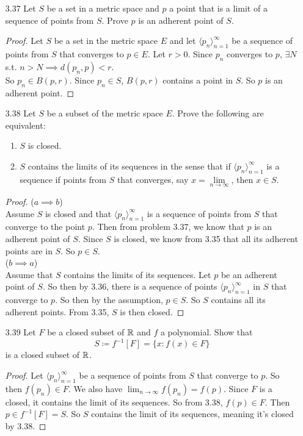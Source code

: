 \documentclass[14pt]{extarticle}
\begin{document}
\begin{enumerate}
		\item[3.37] Let $S$ be a set in a metric space and $p$ a point that is a limit of a sequence of points from $S$. Prove $p$ is an adherent point of $S$.
		\begin{proof}
			Let $S$ be a set in the metric space $E$ and let $\langle p_n \rangle^\infty_{n=1}$ be a sequence of points from $S$ that converges to $p \in E$. Let $r>0$. Since $p_n$ converges to $p$, $\exists N$ s.t. $n>N \implies d(p_n,p) < r$.\\
			So $p_n \in B(p,r)$. Since $p_n \in S$, $B(p,r)$ contains a point in $S$. So $p$ is an adherent point.
		\end{proof}
		
		\item[3.38] Let $S$ be a subset of the metric space $E$. Prove the following are equivalent:
		\begin{enumerate}
			\item $S$ is closed.
			\item $S$ contains the limits of its sequences in the sense that if $\langle p_n \rangle^\infty_{n=1}$ is a sequence if points from $S$ that converges, say $x = \lim\limits_{n\rightarrow\infty}$, then $x \in S$.
		\end{enumerate}
		\begin{proof}
			($a \implies b$)\\
			Assume $S$ is closed and that $\langle p_n \rangle^\infty_{n=1}$ is a sequence of points from $S$ that converge to the point $p$. Then from problem 3.37, we know that $p$ is an adherent point of $S$. Since $S$ is closed, we know from 3.35 that all its adherent points are in $S$. So $p \in S$.\\
			($b \implies a$)\\
			Assume that $S$ contains the limits of its sequences. Let $p$ be an adherent point of $S$. So then by 3.36, there is a sequence of points $\langle p_n \rangle^\infty_{n=1}$ in $S$ that converge to $p$. So then by the assumption, $p \in S$. So $S$ contains all its adherent points. From 3.35, $S$ is then closed. 
		\end{proof}
	
		\item[3.39] Let $F$ be a closed subset of $\mathbb{R}$ and $f$ a polynomial. Show that 
		\[S \coloneq f^{-1}[F] = \{x : f(x) \in F\}\]
		is a closed subset of $\mathbb{R}$.
		\begin{proof}
			Let $\langle p_n \rangle^\infty_{n=1}$ be a sequence of points from $S$ that converge to $p$. So then $f(p_n) \in F$. We also have $\lim_{n\rightarrow\infty} f(p_n) = f(p)$. Since $F$ is a closed, it contains the limit of its sequences. So from 3.38, $f(p) \in F$. Then $p \in f^{-1}[F] = S$. So $S$ contains the limit of its sequences, meaning it's closed by 3.38.
		\end{proof}
		

\end{enumerate}
\end{document}
